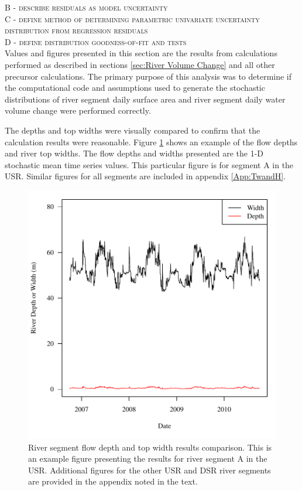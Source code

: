 \begin{linenumbers}
\textsc{B - describe residuals as model uncertainty}\\

\textsc{C - define method of determining parametric univariate uncertainty distribution from regression residuals}\\

\textsc{D - define distribution goodness-of-fit and tests}\\
Values and figures presented in this section are the results from calculations performed as described in sections \ref{sec:River Volume Change} and all other precursor calculations.  The primary purpose of this analysis was to determine if the computational code and assumptions used to generate the stochastic distributions of river segment daily surface area and river segment daily water volume change were performed correctly.

The depths and top widths were visually compared to confirm that the calculation results were reasonable.  Figure \ref{fig:ExampleTWandH} shows an example of the flow depths and river top widths.  The flow depths and widths presented are the 1-D stochastic mean time series values.  This particular figure is for segment A in the USR.  Similar figures for all segments are included in appendix \ref{App:TwandH}.

\begin{figure}[htbp]
\centering
	\includegraphics[width=6in]{"Figures/Results_USR/G d&w Today A"}
	\caption[River segment flow depth and top width results comparison.]{River segment flow depth and top width results comparison.  This is an example figure presenting the results for river segment A in the USR.  Additional figures for the other USR and DSR river segments are provided in the appendix noted in the text.}
	\label{fig:ExampleTWandH}
\end{figure}


\end{linenumbers}
